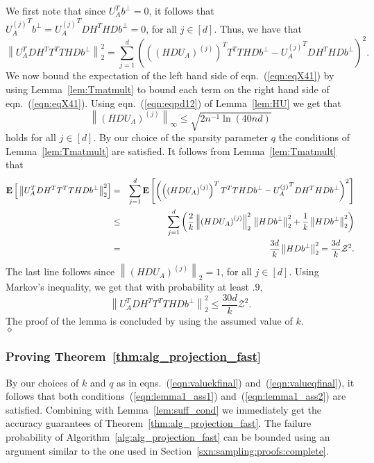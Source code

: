 \documentclass[11pt]{article}
\newcommand{\Expect}[1]{\mbox{}{\bf{E}}\left[#1\right]}
\newcommand{\VTTNorm }[1]{\mbox{}\left\|#1\right\|_2  }
\newcommand{\VTTNormS}[1]{\mbox{}\left\|#1\right\|_2^2}
\newcommand{\VINorm }[1]{\mbox{}\left\|#1\right\|_{\infty}  }
\newenvironment{Proof}{\noindent {\em Proof:}}{\\\hspace*{\fill}\mbox{$\diamond$}}
\begin{document}
\begin{Proof}
We first note that since $U_A^Tb^{\perp}=0$, it follows that ${U_A^{(j)}}^{T}b^{\perp}={U_A^{(j)}}^{T}DH^THDb^{\perp}=0$, for all $j\in [d]$. Thus, we have that
\begin{equation}\label{eqn:eqX41}
\VTTNormS{U_A^TDH^T T^T T HDb^{\perp}}
   = \sum_{j=1}^{d} \left( \left(\left(HDU_A\right)^{(j)}\right)^{T}T^TTHDb^{\perp} - {U_A^{(j)}}^{T}DH^THDb^{\perp} \right)^2   .
\end{equation}
We now bound the expectation of the left hand side of eqn.~(\ref{eqn:eqX41}) by using Lemma~\ref{lem:Tmatmult} to bound each term on the right hand side of eqn.~(\ref{eqn:eqX41}). Using eqn.~(\ref{eqn:eqpd12}) of Lemma~\ref{lem:HU} we get that
$$
\VINorm{\left(HDU_A\right)^{(j)}}
   \le   \sqrt{2n^{-1}\ln(40nd)}
$$
holds for all $j\in[d]$. By our choice of the sparsity parameter $q$ the conditions of Lemma~\ref{lem:Tmatmult} are satisfied. It follows from Lemma~\ref{lem:Tmatmult} that
\begin{eqnarray*}
\Expect{ \VTTNormS{U_A^TDH^TT^TTHDb^{\perp} } }  &  =& \sum_{j=1}^{d} \Expect{ \left( \left(\left(HDU_A\right)^{(j)}\right)^{T}T^TTHDb^{\perp} - {U_A^{(j)}}^{T}DH^THDb^{\perp} \right)^2 } \\
&\leq& \sum_{j=1}^d \left(\frac{2}{k}\VTTNormS{\left(HDU_A\right)^{(j)}}\VTTNormS{HDb^{\perp}} + \frac{1}{k}\VTTNormS{HDb^{\perp}}\right)   \\
&=& \frac{3d}{k}\VTTNormS{HDb^{\perp}} = \frac{3d}{k}{\cal Z}^2.
\end{eqnarray*}
The last line follows since $\VTTNorm{\left(HDU_A\right)^{(j)}}=1$, for all $j\in[d]$. Using Markov's inequality, we get that with probability at least $.9$,
$$
\VTTNormS{U_A^TDH^TT^TTHDb^{\perp}} \le\frac{30d}{k}\mathcal{Z}^2.
$$
The proof of the lemma is concluded by using the assumed value of $k$.
\end{Proof}

\subsubsection{Proving Theorem~\ref{thm:alg_projection_fast}}

By our choices of $k$ and $q$ as in eqns.~(\ref{eqn:valuekfinal}) and~(\ref{eqn:valueqfinal}), it follows that both conditions~(\ref{eqn:lemma1_ass1}) and~(\ref{eqn:lemma1_ass2}) are satisfied. Combining with Lemma~\ref{lem:suff_cond} we immediately get the accuracy guarantees of Theorem~\ref{thm:alg_projection_fast}. The failure probability of Algorithm~\ref{alg:alg_projection_fast} can be bounded using an argument similar to the one used in Section~\ref{sxn:sampling:proofs:complete}.
\end{document}
